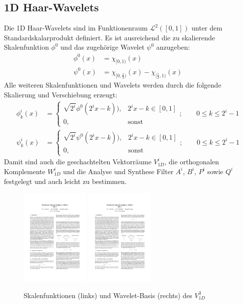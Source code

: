 \subsection{1D Haar-Wavelets}
Die 1D Haar-Wavelets sind im Funktionenraum $\mathcal{L}^2([0,1])$ unter dem Standardskalarprodukt definiert.
Es ist ausreichend die zu skalierende Skalenfunktion $\phi^0$ und das zugehörige Wavelet $\psi^0$ anzugeben:\begin{align*}
	\phi^0(x) &= \chi_{[0,1)}(x)\\
	\psi^0(x) &= \chi_{[0,\frac{1}{2})}(x)-\chi_{[\frac{1}{2}, 1)}(x)
\end{align*}
Alle weiteren Skalenfunktionen und Wavelets werden durch die folgende Skalierung und Verschiebung erzeugt:\begin{align*}
	\phi^i_{k}(x)&=\begin{cases}
	\sqrt{2^i}\phi^0(2^i x-k)),&2^i x-k\in[0,1]\\
	0, &\mathrm{sonst}
	\end{cases};\qquad 0\leq k\leq 2^i-1\\
	\psi^i_{k}(x)&=\begin{cases}
	\sqrt{2^i}\psi^0(2^i x-k)),&2^i x-k\in[0,1]\\
	0, &\mathrm{sonst}
	\end{cases};\qquad 0\leq k\leq 2^i-1
\end{align*}Damit sind auch die geschachtelten Vektorräume $V^i_{1D}$, die orthogonalen Komplemente $W^i_{1D}$ und die Analyse und Synthese Filter $A^i$, $B^i$, $P^i$ sowie $Q^i$ festgelegt und auch leicht zu bestimmen.
\begin{figure}[h]
	\centering
	\includegraphics[page=3, trim=166 490 346 276, clip, width=0.3\textwidth]{4_wavelet_final[14255].pdf}
	\includegraphics[page=3, trim=141 187 365 570, clip, width=0.3\textwidth]{4_wavelet_final[14255].pdf}
	\caption{Skalenfunktionen (links) und Wavelet-Basis (rechts) des $V_{1D}^3$}
\end{figure}

